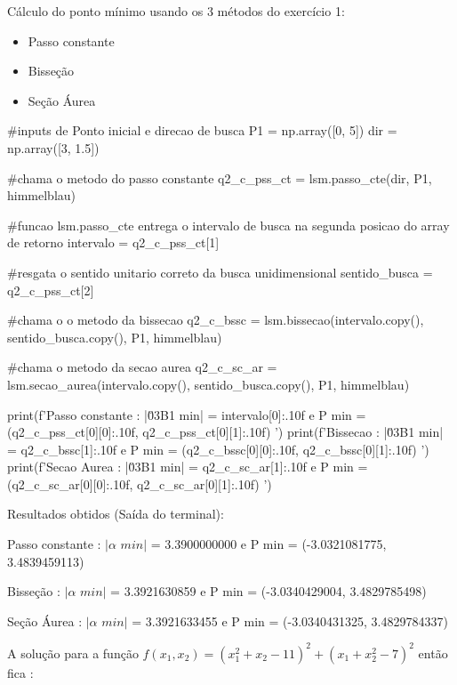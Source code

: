 \documentclass[10pt, a4paper]{article}
\begin{document}
  Cálculo do ponto mínimo usando os 3 métodos do exercício 1:

\begin{itemize}
  \item Passo constante
  \item Bisseção
  \item Seção Áurea
\end{itemize}

\begin{python}

  #inputs de Ponto inicial e direcao de busca
  P1 = np.array([0, 5])
  dir = np.array([3, 1.5])

  #chama o metodo do passo constante
  q2_c_pss_ct = lsm.passo_cte(dir, P1, himmelblau)

  #funcao lsm.passo_cte entrega o intervalo de busca na segunda posicao do array de retorno
  intervalo = q2_c_pss_ct[1]

  #resgata o sentido unitario correto da busca unidimensional
  sentido_busca = q2_c_pss_ct[2]

  #chama o o metodo da bissecao
  q2_c_bssc = lsm.bissecao(intervalo.copy(), sentido_busca.copy(), P1, himmelblau)

  #chama o metodo da secao aurea
  q2_c_sc_ar = lsm.secao_aurea(intervalo.copy(), sentido_busca.copy(), P1, himmelblau)

  print(f'Passo constante : |\u03B1 min| = {intervalo[0]:.10f} e P min = ({q2_c_pss_ct[0][0]:.10f}, {q2_c_pss_ct[0][1]:.10f}) ')
  print(f'Bissecao        : |\u03B1 min| = {q2_c_bssc[1]:.10f} e P min = ({q2_c_bssc[0][0]:.10f}, {q2_c_bssc[0][1]:.10f}) ')
  print(f'Secao Aurea     : |\u03B1 min| = {q2_c_sc_ar[1]:.10f} e P min = ({q2_c_sc_ar[0][0]:.10f}, {q2_c_sc_ar[0][1]:.10f}) ')

\end{python}

Resultados obtidos (Saída do terminal):
\newline


Passo constante : $|\alpha \,\, min|$ = 3.3900000000 e P min = (-3.0321081775, 3.4839459113)

Bisseção        : $|\alpha \,\, min|$ = 3.3921630859 e P min = (-3.0340429004, 3.4829785498)

Seção Áurea     : $|\alpha \,\,  min|$ = 3.3921633455 e P min = (-3.0340431325, 3.4829784337)\newline

A solução para a função $f(x_1, x_2) = (x_1^2 + x_2 - 11)^2 + (x_1 + x_2^2 - 7)^2$ então fica :
\newline
\end{document}
